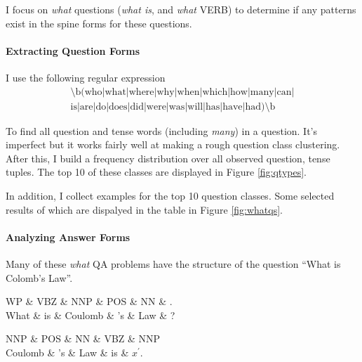 \documentclass[twoside]{article}
\begin{document}
I focus on \textit{what} questions (\textit{what is}, and \textit{what} VERB) to determine if any patterns exist in the spine forms for these questions.

\paragraph {Extracting Question Forms} I use the following regular expression
\begin{equation} \label{eq:qre}
\begin{split}
\text{\textbackslash b(who|what|where|why|when|which|how|many|can|}\\
\text{is|are|do|does|did|were|was|will|has|have|had)\textbackslash b}
\end{split}
\end{equation}

To find all question and tense words (including \textit{many}) in a question.  It's imperfect but it works fairly well at making a rough question class clustering.  After this, I build a frequency distribution over all observed question, tense tuples.  The top 10 of these classes are displayed in Figure \ref{fig:qtypes}.

In addition, I collect examples for the top 10 question classes.  Some selected results of which are dispalyed in the table in Figure \ref{fig:whatqs}.

\paragraph{Analyzing Answer Forms}

Many of these \textit{what} QA problems have the structure of the question ``What is Colomb's Law''.

\begin{multicols}{2}
\begin{dependency}[edge horizontal padding=5pt]\begin{deptext}[column sep=0.1cm]WP \& VBZ \& NNP \& POS \& NN \& .\\What \& is \& Coulomb \& 's \& Law \& ?\\\end{deptext}\end{dependency}


\begin{dependency}[edge horizontal padding=5pt]\begin{deptext}[column sep=0.1cm]NNP \& POS \& NN \& VBZ \& NNP\\Coulomb \& 's \& Law \& is \& $x^\prime$.\\\end{deptext}\end{dependency}

\end{multicols}
\end{document}
